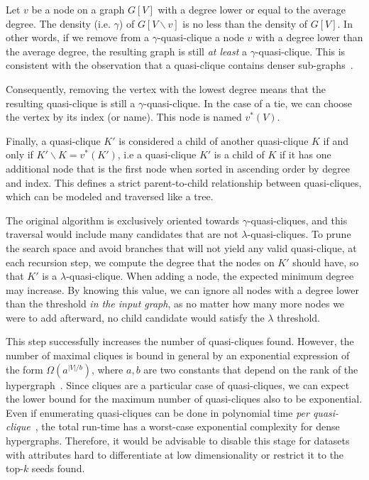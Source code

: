 Let $v$ be a node on a graph $G[V]$ with a degree lower or equal to the average degree.
The density (i.e. $\gamma$) of $G[V \backslash v]$ is no less than the density of $G[V]$.
In other words, if we remove from a $\gamma$-quasi-clique a node $v$ with a
degree lower than the average degree, the resulting graph is still
\emph{at least} a $\gamma$-quasi-clique.
This is consistent with the observation that a quasi-clique contains
denser sub-graphs~\cite{SaneiMehri2018}.

Consequently, removing the vertex with the lowest degree means that the resulting
quasi-clique is still a $\gamma$-quasi-clique. In the case of a tie, we can choose
the vertex by its index (or name). This node is named $v^*(V)$.

Finally, a quasi-clique $K'$ is considered a child of another quasi-clique $K$
if and only if $K' \backslash K = {v^*(K')}$, i.e a quasi-clique $K'$ is a child
of $K$ if it has one additional
node that is the first node when sorted in ascending order by degree and index.
This defines a strict parent-to-child relationship between quasi-cliques,
which can be modeled and traversed like a tree.

The original algorithm \cite{uno_efficient_2010} is exclusively oriented towards
$\gamma$-quasi-cliques, and
this traversal would include many candidates that are not $\lambda$-quasi-cliques.
To prune the search space and avoid branches that will not yield any valid
quasi-clique, at each recursion step, we compute the degree that the nodes on
$K'$ should have, so that $K'$ is a $\lambda$-quasi-clique.
When adding a node, the expected minimum degree may increase.
By knowing this value, we can ignore all nodes with a degree lower than the threshold
\emph{in the input graph}, as no matter how many more nodes we were to add
afterward, no child candidate would satisfy the $\lambda$ threshold.

This step successfully increases the number of quasi-cliques found.
However, the number of maximal cliques is bound in general by an exponential expression of the form
$\Omega(a^{|V|/b})$, where $a, b$ are two constants that depend on the rank of the hypergraph~\cite{Tomescu1981}.
Since cliques are a particular case of quasi-cliques, we can expect the lower bound for the
maximum number of quasi-cliques also to be exponential.
Even if enumerating quasi-cliques can be done in polynomial time
\emph{per quasi-clique}~\cite{uno_efficient_2010}, the total run-time has a worst-case exponential
complexity for dense hypergraphs. Therefore, it would be advisable to disable this stage for datasets
with attributes hard to differentiate at low dimensionality or restrict it to the top-$k$ 
seeds found.
\newpage

